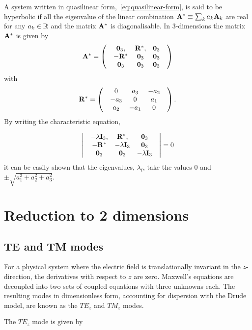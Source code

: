 A system written in quasilinear form,~\eqref{eq:quasilinear-form}, is said to be hyperbolic if all the eigenvalue of the linear combination $ \mathbf{A}^{*} \equiv \sum_{k} a_{k} \mathbf{A}_k $ are real for any $a_{k} \in \mathbb{R}$ and the matrix $\mathbf{A}^{*}$ is diagonalisable. In $3$-dimensions the matrix $\mathbf{A}^{*}$ is given by
$$
  \mathbf{A}^{*} =
  \begin{pmatrix}
 & \mathbf{0}_3 , & \mathbf{R}^{*}, & \mathbf{0}_3 \\
 & -\mathbf{R}^{*} & \mathbf{0}_3 & \mathbf{0}_3 \\
 & \mathbf{0}_3 & \mathbf{0}_3 & \mathbf{0}_3 
 & \end{pmatrix}
$$
with
$$
  \mathbf{R}^{*} =
  \begin{pmatrix}
 & 0 & a_3 & -a_2 \\
 & -a_3 & 0 & a_1 \\
& a_2 & -a_1 & 0 
 & \end{pmatrix} .
$$
By writing the characteristic equation,

$$
  \begin{vmatrix}
 & -\lambda \mathbf{I}_3, & \mathbf{R}^{*}, & \mathbf{0}_3 \\
 & -\mathbf{R}^{*} & -\lambda \mathbf{I}_3 & \mathbf{0}_3 \\
 & \mathbf{0}_3 & \mathbf{0}_3 & -\lambda \mathbf{I}_3
 & \end{vmatrix}
= 0
$$
it can be easily shown that the eigenvalues, $\lambda_{i}$, take the values $0$ and $\pm \sqrt{a_1^2 + a_2^2 + a_3^2}$.

% 

\section{Reduction to 2 dimensions}
\subsection{TE and TM modes}
For a physical system where the electric field is translationally invariant in
the $z$-direction, the derivatives with respect to $z$ are zero. Maxwell's
equations are decoupled into two sets of coupled equations with three unknowns
each. The resulting modes in dimensionless form, accounting for dispersion with
the Drude model, are known as the $TE_z$ and $TM_z$ modes.

The $TE_z$ mode is given by

